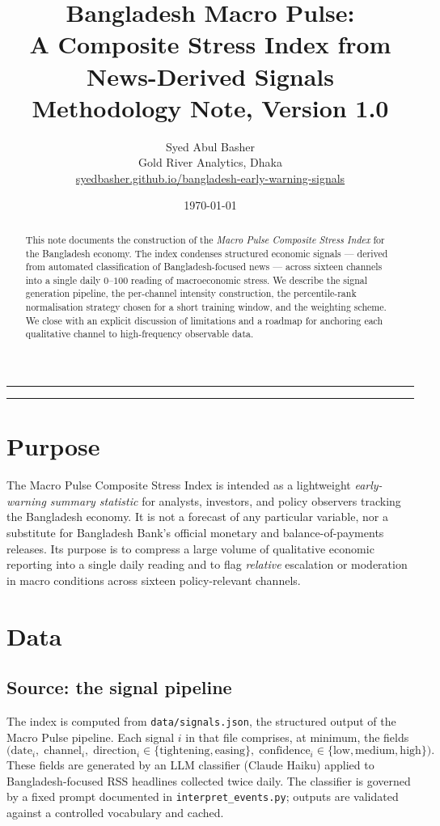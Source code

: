\documentclass[11pt, a4paper]{article}
\title{\textbf{Bangladesh Macro Pulse: \\
       A Composite Stress Index from News-Derived Signals} \\
       \vspace{0.4em}
       \large Methodology Note, Version 1.0}
\author{Syed Abul Basher \\
        \small Gold River Analytics, Dhaka \\
        \small \href{https://syedbasher.github.io/bangladesh-early-warning-signals/}%
                    {syedbasher.github.io/bangladesh-early-warning-signals}}
\date{\today}
\begin{document}
\maketitle
\vspace{-1em}
\hrule
\vspace{1em}

\begin{abstract}
\noindent
This note documents the construction of the \textit{Macro Pulse Composite
Stress Index} for the Bangladesh economy. The index condenses structured
economic signals --- derived from automated classification of
Bangladesh-focused news --- across sixteen channels into a single daily
$0$--$100$ reading of macroeconomic stress. We describe the signal
generation pipeline, the per-channel intensity construction, the
percentile-rank normalisation strategy chosen for a short training
window, and the weighting scheme. We close with an explicit discussion
of limitations and a roadmap for anchoring each qualitative channel to
high-frequency observable data.
\end{abstract}

\vspace{0.5em}
\tableofcontents
\vspace{1em}
\hrule

\section{Purpose}

The Macro Pulse Composite Stress Index is intended as a lightweight
\textit{early-warning summary statistic} for analysts, investors, and
policy observers tracking the Bangladesh economy. It is not a forecast
of any particular variable, nor a substitute for Bangladesh Bank's
official monetary and balance-of-payments releases. Its purpose is to
compress a large volume of qualitative economic reporting into a single
daily reading and to flag \textit{relative} escalation or moderation in
macro conditions across sixteen policy-relevant channels.

\section{Data}

\subsection{Source: the signal pipeline}

The index is computed from \texttt{data/signals.json}, the structured
output of the Macro Pulse pipeline. Each signal $i$ in that file
comprises, at minimum, the fields
\[
  \bigl(
    \text{date}_i,\;
    \text{channel}_i,\;
    \text{direction}_i \in \{\text{tightening}, \text{easing}\},\;
    \text{confidence}_i \in \{\text{low}, \text{medium}, \text{high}\}
  \bigr).
\]
These fields are generated by an LLM classifier (Claude Haiku) applied
to Bangladesh-focused RSS headlines collected twice daily. The
classifier is governed by a fixed prompt documented in
\texttt{interpret\_events.py}; outputs are validated against a
controlled vocabulary and cached.
\end{document}
